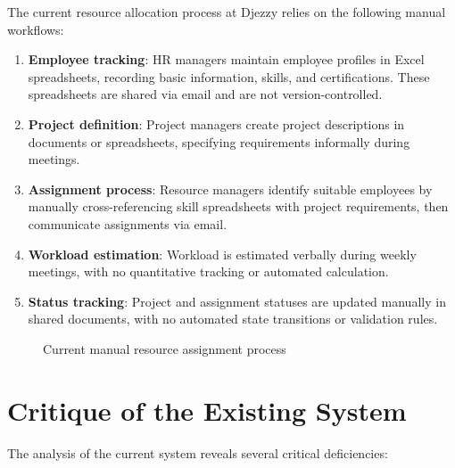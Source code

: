 \documentclass{bts-report}
\begin{document}
The current resource allocation process at Djezzy relies on the following manual workflows:

\begin{enumerate}
  \item \textbf{Employee tracking}: HR managers maintain employee profiles in Excel spreadsheets, recording basic information, skills, and certifications. These spreadsheets are shared via email and are not version-controlled.
  \item \textbf{Project definition}: Project managers create project descriptions in documents or spreadsheets, specifying requirements informally during meetings.
  \item \textbf{Assignment process}: Resource managers identify suitable employees by manually cross-referencing skill spreadsheets with project requirements, then communicate assignments via email.
  \item \textbf{Workload estimation}: Workload is estimated verbally during weekly meetings, with no quantitative tracking or automated calculation.
  \item \textbf{Status tracking}: Project and assignment statuses are updated manually in shared documents, with no automated state transitions or validation rules.
\end{enumerate}

\begin{figure}[htbp]
  \centering
  \resizebox{0.92\textwidth}{!}{}
  \caption{Current manual resource assignment process}
  \label{fig:existing-workflow}
\end{figure}

\section{Critique of the Existing System}

The analysis of the current system reveals several critical deficiencies:
\end{document}
